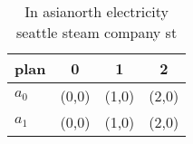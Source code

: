 \documentclass[a4paper]{article}
\begin{document}
\begin{table}
\begin{adjustbox}{width=0.6\columnwidth}
\begin{tabular}{|l|l|l|l|}
\hline
\textbf{plan} & \multicolumn{1}{c|}{\textbf{0}} & \multicolumn{1}{c|}{\textbf{1}} & \multicolumn{1}{c|}{\textbf{2}} \\ \hline
\textbf{$a_0$}  & (0,0) & (1,0) & (2,0) \\ \hline
\textbf{$a_1$}  & (0,0) & (1,0) & (2,0) \\ \hline
\end{tabular}
\end{adjustbox}
\caption{In asianorth electricity seattle steam company st
}
\end{table}
\end{document}
